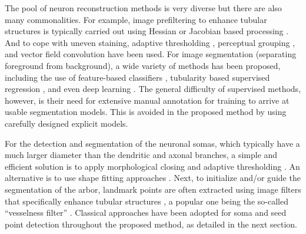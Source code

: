 The pool of neuron reconstruction methods is very diverse \cite{meijering2010neuron, donohue2011automated, acciai2016automated, peng2015bigneuron} but there are also many commonalities. For example, image prefiltering to enhance tubular structures is typically carried out using Hessian or Jacobian based processing \cite{xiong2006automated, al2008improved, yuan2009mdl, wang2011broadly}. And to cope with uneven staining, adaptive thresholding \cite{zhou2015adaptive}, perceptual grouping \cite{narayanaswamy20113}, and vector field convolution \cite{mukherjee2015tubularity} have been used. For image segmentation (separating foreground from background), a wide variety of methods has been proposed, including the use of feature-based classifiers \cite{turetken2011automated, chen2015smarttracing, jimenez2015improved}, tubularity based supervised regression \cite{sironi2016multiscale}, and even deep learning \cite{li2017deep}. The general difficulty of supervised methods, however, is their need for extensive manual annotation for training to arrive at usable segmentation models. This is avoided in the proposed method by using carefully designed explicit models.

For the detection and segmentation of the neuronal somas, which typically have a much larger diameter than the dendritic and axonal branches, a simple and efficient solution is to apply morphological closing and adaptive thresholding \cite{yan2013automated}. An alternative is to use shape fitting approaches \cite{quan2013neurogps}. Next, to initialize and/or guide the segmentation of the arbor, landmark points are often extracted using image filters that specifically enhance tubular structures \cite{wang2011broadly, turetken2011automated, choromanska2012automatic, su2012junction, radojevic2016fuzzy}, a popular one being the so-called ``vesselness filter'' \cite{frangi1998multiscale}. Classical approaches have been adopted for soma and seed point detection throughout the proposed method, as detailed in the next section.

